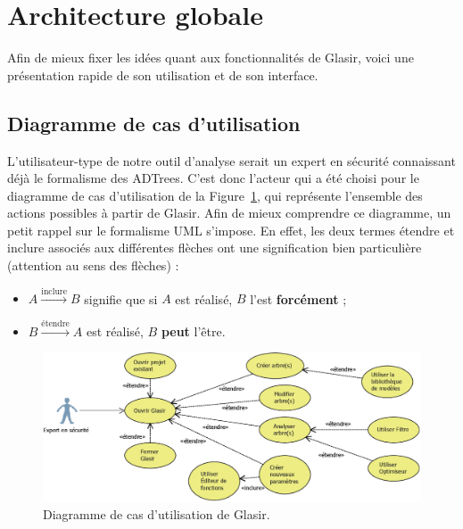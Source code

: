 \section{Architecture globale}
    \label{sec:archiGlobale}
    
    Afin de mieux fixer les idées quant aux fonctionnalités de Glasir, voici une présentation rapide de son utilisation et de son interface.
	    
    \subsection{Diagramme de cas d'utilisation}
    \label{sec:casutil}
    
    L'utilisateur-type de notre outil d'analyse serait un expert en sécurité connaissant déjà le formalisme des ADTrees. C'est donc l'acteur qui a été choisi pour le diagramme de cas d'utilisation de la {\sc Figure}~\ref{fig:use_case}, qui représente l'ensemble des actions possibles à partir de Glasir. Afin de mieux comprendre ce diagramme, un petit rappel sur le formalisme UML s'impose. En effet, les deux termes \og étendre \fg{} et \og inclure \fg{} associés aux différentes flèches ont une signification bien particulière (attention au sens des flèches) :

    \begin{itemize}
    \item[] $ A \stackrel{\text{inclure}}{\longrightarrow} B$ signifie que si $A$ est réalisé, $B$ l'est {\bf forcément} ;
    \item[] $ B \stackrel{\text{étendre}}{\longrightarrow} A$ est réalisé, $B$ {\bf peut} l'être.
    \end{itemize}

    \begin{figure}[H]
        \centering
        \includegraphics[height=0.5\textwidth]{figure/UseCaseDiagram.png}
        \caption{Diagramme de cas d'utilisation de Glasir.}
        \label{fig:use_case}
    \end{figure}

